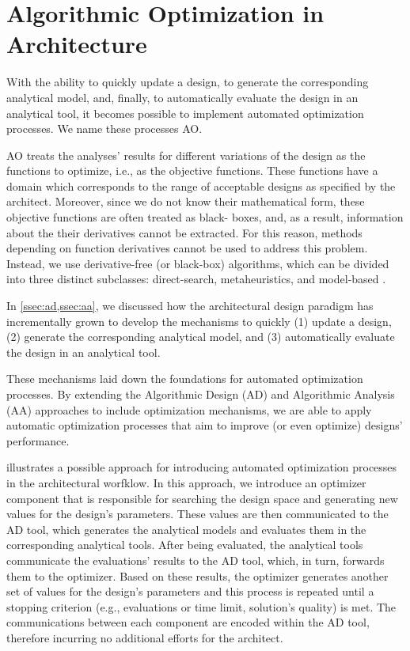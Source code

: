 \section{Algorithmic Optimization in Architecture}
\label{sec: Methodology}

With the ability to quickly update a design, to generate the corresponding analytical model, and, finally, to automatically evaluate the design in an analytical tool, it becomes possible to implement automated optimization processes. We name these processes \ac{AO}.

\ac{AO} treats the analyses' results for different variations of the design as the functions to optimize, i.e., as the objective functions. These functions have a domain which corresponds to the range of acceptable designs as specified by the architect. Moreover, since we do not know their mathematical form, these objective functions are often treated as black- boxes, and, as a result, information about the their derivatives cannot be extracted. For this reason, methods depending on function derivatives cannot be used to address this problem. Instead, we use derivative-free (or black-box) algorithms, which can be divided into three distinct subclasses: direct-search, metaheuristics, and model-based \cite{Conn2009,Glover2003Metaheuristics,Koziel2011}.


In \cref{ssec:ad,ssec:aa}, we discussed how the architectural design paradigm has incrementally grown to develop the mechanisms to quickly (1) update a design, (2) generate the corresponding analytical model, and (3) automatically evaluate the design in an analytical tool.%

These mechanisms laid down the foundations for automated optimization processes. By extending the Algorithmic Design (\ac{AD}) and Algorithmic Analysis (\ac{AA}) approaches to include optimization mechanisms, we are able to apply automatic optimization processes that aim to improve (or even optimize) designs' performance. 


 illustrates a possible approach for introducing automated optimization processes in the architectural worfklow. In this approach, we introduce an optimizer component that is responsible for searching the design space and generating new values for the design's parameters. These values are then communicated to the \ac{AD} tool, which generates the analytical models and evaluates them in the corresponding analytical tools. After being evaluated, the analytical tools communicate the evaluations' results to the \ac{AD} tool, which, in turn, forwards them to the optimizer. Based on these results, the optimizer generates another set of values for the design's parameters and this process is repeated until a stopping criterion (e.g., evaluations or time limit, solution's quality) is met. The communications between each component are encoded within the \ac{AD} tool, therefore incurring no additional efforts for the architect.

